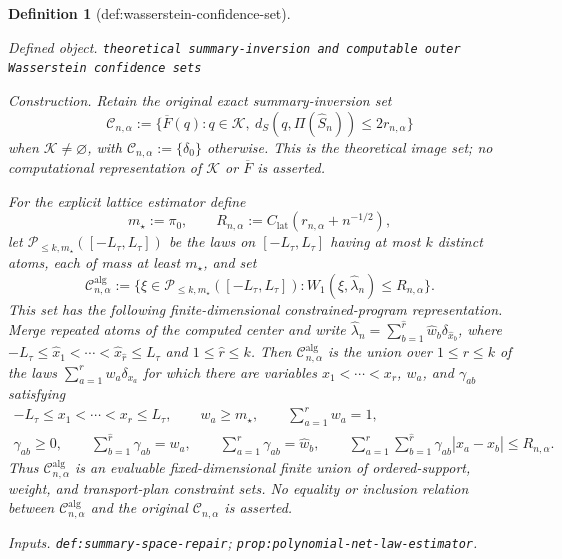 \documentclass{article}
\newtheorem{definition}{Definition}
\begin{document}
\begin{definition}[def:wasserstein-confidence-set]\label{def:wasserstein-confidence-set}
\par\smallskip\noindent\emph{Defined object.} \texttt{theoretical summary-\allowbreak{}inversion and computable outer Wasserstein confidence sets}
\par\smallskip\noindent\emph{Construction.} Retain the original exact summary-inversion set
\[
\mathcal C_{n,\alpha}:=
\{\overline F(q):q\in\mathcal K,\ d_S(q,\Pi(\widehat S_n))\le2r_{n,\alpha}\}
\]
when \(\mathcal K\ne\varnothing\), with \(\mathcal C_{n,\alpha}:=\{\delta_0\}\) otherwise.  This is the theoretical image set; no computational representation of \(\mathcal K\) or \(\overline F\) is asserted.

For the explicit lattice estimator define
\[
m_\star:=\pi_0,
\qquad R_{n,\alpha}:=C_{\mathrm{lat}}(r_{n,\alpha}+n^{-1/2}),
\]
let \(\mathcal P_{\le k,m_\star}([-L_{\tau},L_{\tau}])\) be the laws on \([-L_{\tau},L_{\tau}]\) having at most \(k\) distinct atoms, each of mass at least \(m_\star\), and set
\[
\mathcal C^{\mathrm{alg}}_{n,\alpha}:=
\{\xi\in\mathcal P_{\le k,m_\star}([-L_{\tau},L_{\tau}]):
W_1(\xi,\widehat\lambda_n)\le R_{n,\alpha}\}.
\]
This set has the following finite-dimensional constrained-program representation.  Merge repeated atoms of the computed center and write
\(\widehat\lambda_n=\sum_{b=1}^{\widehat r}\widehat w_b\delta_{\widehat x_b}\), where
\(-L_{\tau}\le\widehat x_1<\cdots<\widehat x_{\widehat r}\le L_{\tau}\) and \(1\le\widehat r\le k\).  Then \(\mathcal C^{\mathrm{alg}}_{n,\alpha}\) is the union over \(1\le r\le k\) of the laws \(\sum_{a=1}^rw_a\delta_{x_a}\) for which there are variables
\(x_1<\cdots<x_r\), \(w_a\), and \(\gamma_{ab}\) satisfying
\[
\begin{gathered}
-L_{\tau}\le x_1<\cdots<x_r\le L_{\tau},
\qquad w_a\ge m_\star,
\qquad \sum_{a=1}^rw_a=1,\\
\gamma_{ab}\ge0,
\qquad \sum_{b=1}^{\widehat r}\gamma_{ab}=w_a,
\qquad \sum_{a=1}^{r}\gamma_{ab}=\widehat w_b,
\qquad \sum_{a=1}^{r}\sum_{b=1}^{\widehat r}
\gamma_{ab}|x_a-\widehat x_b|\le R_{n,\alpha}.
\end{gathered}
\]
Thus \(\mathcal C^{\mathrm{alg}}_{n,\alpha}\) is an evaluable fixed-dimensional finite union of ordered-support, weight, and transport-plan constraint sets.  No equality or inclusion relation between \(\mathcal C^{\mathrm{alg}}_{n,\alpha}\) and the original \(\mathcal C_{n,\alpha}\) is asserted.
\par\smallskip\noindent\emph{Inputs.} \texttt{def:\allowbreak{}summary-\allowbreak{}space-\allowbreak{}repair}; \texttt{prop:\allowbreak{}polynomial-\allowbreak{}net-\allowbreak{}law-\allowbreak{}estimator}.
\end{definition}
\end{document}
